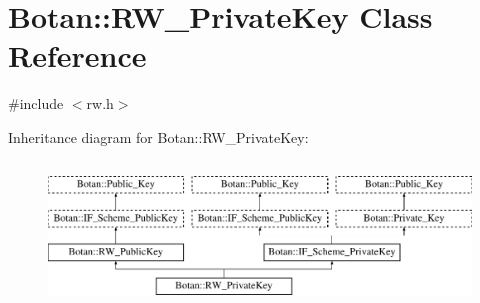 \hypertarget{classBotan_1_1RW__PrivateKey}{\section{Botan\-:\-:R\-W\-\_\-\-Private\-Key Class Reference}
\label{classBotan_1_1RW__PrivateKey}
}


{\ttfamily \#include $<$rw.\-h$>$}

Inheritance diagram for Botan\-:\-:R\-W\-\_\-\-Private\-Key\-:\begin{figure}[H]
\begin{center}
\leavevmode
\includegraphics[height=3.929825cm]{classBotan_1_1RW__PrivateKey}
\end{center}
\end{figure}
